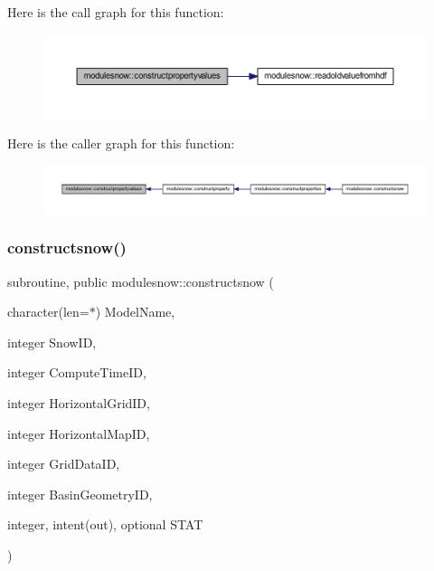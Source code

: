 Here is the call graph for this function\+:\nopagebreak
\begin{figure}[H]
\begin{center}
\leavevmode
\includegraphics[width=350pt]{namespacemodulesnow_a6599173ecfbf81367f1afdb4ac9a5c81_cgraph}
\end{center}
\end{figure}
Here is the caller graph for this function\+:\nopagebreak
\begin{figure}[H]
\begin{center}
\leavevmode
\includegraphics[width=350pt]{namespacemodulesnow_a6599173ecfbf81367f1afdb4ac9a5c81_icgraph}
\end{center}
\end{figure}
\mbox{\label{namespacemodulesnow_af7722587c67638fd4a4d05e998e957b0}} 
\subsubsection{\texorpdfstring{constructsnow()}{constructsnow()}}
{\footnotesize\ttfamily subroutine, public modulesnow\+::constructsnow (\begin{DoxyParamCaption}\item[{character(len=$\ast$)}]{Model\+Name,  }\item[{integer}]{Snow\+ID,  }\item[{integer}]{Compute\+Time\+ID,  }\item[{integer}]{Horizontal\+Grid\+ID,  }\item[{integer}]{Horizontal\+Map\+ID,  }\item[{integer}]{Grid\+Data\+ID,  }\item[{integer}]{Basin\+Geometry\+ID,  }\item[{integer, intent(out), optional}]{S\+T\+AT }\end{DoxyParamCaption})}

